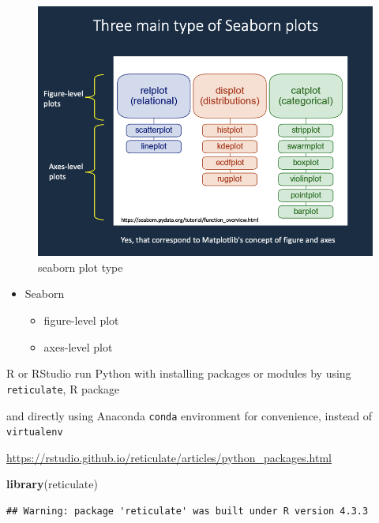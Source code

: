\documentclass[
]{book}
\newenvironment{Shaded}{\begin{snugshade}}{\end{snugshade}}
\newcommand{\FunctionTok}[1]{\textcolor[rgb]{0.13,0.29,0.53}{\textbf{#1}}}
\newcommand{\NormalTok}[1]{#1}
\providecommand{\tightlist}{%
  \setlength{\itemsep}{0pt}\setlength{\parskip}{0pt}}
\theoremstyle{definition}
\theoremstyle{definition}
\theoremstyle{definition}
\theoremstyle{definition}
\theoremstyle{remark}
\begin{document}
\begin{figure}
\includegraphics[width=1\linewidth]{img/seaborn-plot-type} \caption{seaborn plot type}\label{fig:seaborn-plot-type}
\end{figure}

\begin{itemize}
\tightlist
\item
  Seaborn

  \begin{itemize}
  \tightlist
  \item
    figure-level plot
  \item
    axes-level plot
  \end{itemize}
\end{itemize}

R or RStudio run Python with installing packages or modules by using \texttt{reticulate}, R package

and directly using Anaconda \texttt{conda} environment for convenience, instead of \texttt{virtualenv}

\url{https://rstudio.github.io/reticulate/articles/python_packages.html}

\begin{Shaded}
\begin{Highlighting}[]
\FunctionTok{library}\NormalTok{(reticulate)}
\end{Highlighting}
\end{Shaded}

\begin{verbatim}
## Warning: package 'reticulate' was built under R version 4.3.3
\end{verbatim}
\end{document}
